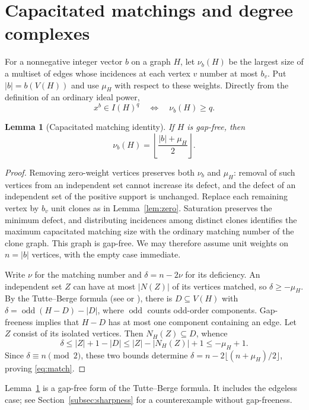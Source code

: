 \documentclass[11pt,a4paper]{article}
\newtheorem{lemma}[theorem]{Lemma}
\theoremstyle{definition}
\begin{document}
\section{Capacitated matchings and degree complexes}\label{sec:algebra}
For a nonnegative integer vector $b$ on a graph $H$, let $\nu_b(H)$ be the largest size of a multiset of edges whose incidences at each vertex $v$ number at most $b_v$. Put $|b|=b(V(H))$ and use $\mu_H$ with respect to these weights. Directly from the definition of an ordinary ideal power,
\begin{equation}\label{eq:member}
 x^b\in I(H)^q\quad\Longleftrightarrow\quad \nu_b(H)\geq q.
\end{equation}
\begin{lemma}[Capacitated matching identity]\label{lem:matching}
If $H$ is gap-free, then
\begin{equation}\label{eq:match}
 \nu_b(H)=\left\lfloor\frac{|b|+\mu_H}{2}\right\rfloor.
\end{equation}
\end{lemma}
\begin{proof}
Removing zero-weight vertices preserves both $\nu_b$ and $\mu_H$: removal of such vertices from an independent set cannot increase its defect, and the defect of an independent set of the positive support is unchanged. Replace each remaining vertex by $b_v$ unit clones as in Lemma~\ref{lem:zero}. Saturation preserves the minimum defect, and distributing incidences among distinct clones identifies the maximum capacitated matching size with the ordinary matching number of the clone graph. This graph is gap-free. We may therefore assume unit weights on $n=|b|$ vertices, with the empty case immediate.

Write $\nu$ for the matching number and $\delta=n-2\nu$ for its deficiency. An independent set $Z$ can have at most $|N(Z)|$ of its vertices matched, so $\delta\geq -\mu_H$. By the Tutte--Berge formula (see \cite{LP} or \cite[Section 24.1]{Schrijver}), there is $D\subseteq V(H)$ with $\delta=\operatorname{odd}(H-D)-|D|$, where $\operatorname{odd}$ counts odd-order components. Gap-freeness implies that $H-D$ has at most one component containing an edge. Let $Z$ consist of its isolated vertices. Then $N_H(Z)\subseteq D$, whence
\[
 \delta\leq |Z|+1-|D|\leq |Z|-|N_H(Z)|+1\leq -\mu_H+1.
\]
Since $\delta\equiv n\pmod2$, these two bounds determine $\delta=n-2\lfloor(n+\mu_H)/2\rfloor$, proving \eqref{eq:match}.
\end{proof}
Lemma~\ref{lem:matching} is a gap-free form of the Tutte--Berge formula. It includes the edgeless case; see Section~\ref{subsec:sharpness} for a counterexample without gap-freeness.
\end{document}
